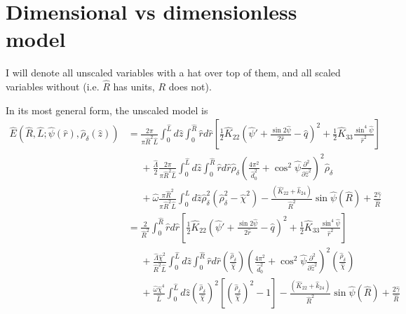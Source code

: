 \documentclass[12pt]{article}
\begin{document}


\section{Dimensional vs dimensionless model}
I will denote all unscaled variables with a hat over top of them, and all scaled variables without (i.e. $\hat{R}$ has units, $R$ does not).

In its most general form, the unscaled model is
\begin{align}\label{eq:generalunits}
\hat{E}(\hat{R},\hat{L};\hat{\psi}(\hat{r}),\hat{\rho}_{\delta}(\hat{z}))&=\frac{2\pi}{\pi\hat{R}^2\hat{L}}\int_0^{\hat{L}}d\hat{z}\int_0^{\hat{R}}\hat{r}d\hat{r}\left[\frac{1}{2}\hat{K}_{22}\left(\hat{\psi}'+\frac{\sin2\hat{\psi}}{2\hat{r}}-\hat{q}\right)^2+\frac{1}{2}\hat{K}_{33}\frac{\sin^4\hat{\psi}}{\hat{r}^2}\right]\nonumber\\
&\phantom{=}+\frac{\hat{\Lambda}}{2}\frac{2\pi}{\pi\hat{R}^2\hat{L}}\int_0^{\hat{L}}d\hat{z}\int_0^{\hat{R}}\hat{r}d\hat{r}\hat{\rho}_{\delta}\left(\frac{4\pi^2}{\hat{d}^2_0}+\cos^2\hat{\psi}\frac{\partial^2}{\partial\hat{z}^2}\right)^2\hat{\rho}_{\delta}\nonumber\\
&\phantom{=}+\hat{\omega}\frac{\pi\hat{R}^2}{\pi\hat{R}^2\hat{L}}\int_0^{\hat{L}}d\hat{z}\hat{\rho}_{\delta}^2\left(\hat{\rho}_{\delta}^2-\hat{\chi}^2\right)-\frac{(\hat{K}_{22}+\hat{k}_{24})}{\hat{R}^2}\sin\hat{\psi}(\hat{R})+\frac{2\hat{\gamma}}{\hat{R}}\nonumber\\
&=\frac{2}{\hat{R}^2}\int_0^{\hat{R}}\hat{r}d\hat{r}\left[\frac{1}{2}\hat{K}_{22}\left(\hat{\psi}'+\frac{\sin2\hat{\psi}}{2\hat{r}}-\hat{q}\right)^2+\frac{1}{2}\hat{K}_{33}\frac{\sin^4\hat{\psi}}{\hat{r}^2}\right]\nonumber\\
&\phantom{=}+\frac{\hat{\Lambda}\hat{\chi}^2}{\hat{R}^2\hat{L}}\int_0^{\hat{L}}d\hat{z}\int_0^{\hat{R}}\hat{r}d\hat{r}\left(\frac{\hat{\rho}_{\delta}}{\hat{\chi}}\right)\left(\frac{4\pi^2}{\hat{d}^2_0}+\cos^2\hat{\psi}\frac{\partial^2}{\partial\hat{z}^2}\right)^2\left(\frac{\hat{\rho}_{\delta}}{\hat{\chi}}\right)\nonumber\\
&\phantom{=}+\frac{\hat{\omega}\hat{\chi}^4}{\hat{L}}\int_0^{\hat{L}}d\hat{z}\left(\frac{\hat{\rho}_{\delta}}{\hat{\chi}}\right)^2\left[\left(\frac{\hat{\rho}_{\delta}}{\hat{\chi}}\right)^2-1\right]-\frac{(\hat{K}_{22}+\hat{k}_{24})}{\hat{R}^2}\sin\hat{\psi}(\hat{R})+\frac{2\hat{\gamma}}{\hat{R}}\nonumber\\
\end{align}
\end{document}
